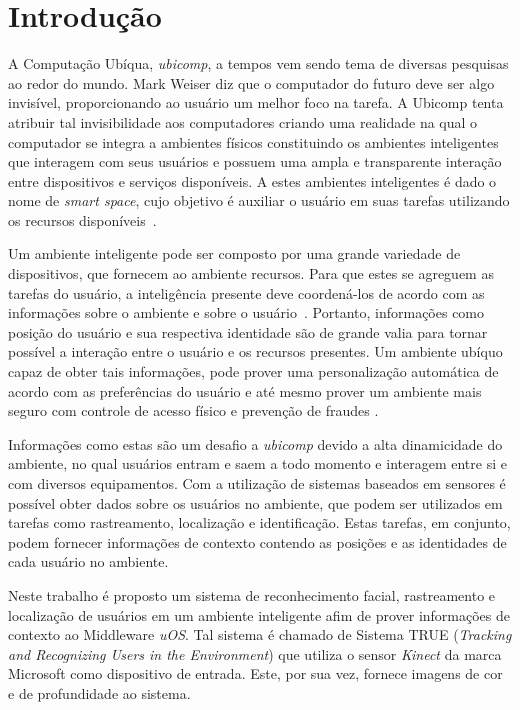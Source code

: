 \chapter{Introdução}
	
A Computação Ubíqua, \textit{ubicomp}, a tempos vem sendo tema de diversas
pesquisas ao redor do mundo. Mark Weiser diz que o computador do futuro deve ser
algo invisível, proporcionando ao usuário um melhor foco na tarefa. A Ubicomp
tenta atribuir tal invisibilidade aos computadores criando uma realidade na qual
o computador se integra a ambientes físicos constituindo os ambientes
inteligentes que interagem com seus usuários e possuem uma ampla e transparente
interação entre dispositivos e serviços disponíveis. A estes ambientes
inteligentes é dado o nome de \textit{smart space}, cujo objetivo é auxiliar o
usuário em suas tarefas utilizando os recursos
disponíveis~\cite{fabriciobuzzeto,alegomes,weiser1, weiser2}.
	
Um ambiente inteligente pode ser composto por uma grande variedade de
dispositivos, que fornecem ao ambiente recursos. Para que estes se agreguem as
tarefas do usuário, a inteligência presente deve coordená-los de acordo com as
informações sobre o ambiente e sobre o usuário~\cite{fabriciobuzzeto}. Portanto,
informações como posição do usuário e sua respectiva identidade são de grande
valia para tornar possível a interação entre o usuário e os recursos presentes.
Um ambiente ubíquo capaz de obter tais informações, pode prover uma
personalização automática de acordo com as preferências do usuário e até mesmo
prover um ambiente mais seguro com controle de acesso físico e prevenção de
fraudes \cite{saocarlos}.
	
Informações como estas são um desafio a \textit{ubicomp} devido a alta
dinamicidade do ambiente, no qual usuários entram e saem a todo momento e interagem entre si e
com diversos equipamentos. Com a utilização de sistemas baseados em sensores é
possível obter dados sobre os usuários no ambiente, que podem ser utilizados em
tarefas como rastreamento, localização e identificação. Estas tarefas, em
conjunto, podem fornecer informações de contexto contendo as posições e as
identidades de cada usuário no ambiente.
	
Neste trabalho é proposto um sistema de reconhecimento facial, rastreamento e
localização de usuários em um ambiente inteligente afim de prover informações de
contexto ao Middleware \textit{uOS}. Tal sistema é chamado de Sistema TRUE
(\textit{Tracking and Recognizing Users in the Environment}) que utiliza o
sensor \textit{Kinect} da marca Microsoft como dispositivo de entrada. Este, por
sua vez, fornece imagens de cor e de profundidade ao sistema.
	
